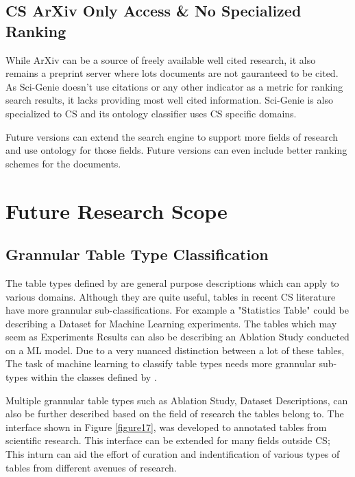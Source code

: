 \subsection{CS ArXiv Only Access \& No Specialized Ranking}
While ArXiv can be a source of freely available well cited research, it also remains a preprint server where lots documents are not gauranteed to be cited. As Sci-Genie doesn't use citations or any other indicator as a metric for ranking search results, it lacks providing most well cited information. Sci-Genie is also specialized to CS and its ontology classifier uses CS specific domains. 

Future versions can extend the search engine to support more fields of research and use ontology for those fields. Future versions can even include better ranking schemes for the documents.  

\section{Future Research Scope}
\label{conclusion:future-scope}
\subsection{Grannular Table Type Classification}
\label{conclusion:future-scope:type-class}

The table types defined by \cite{kim2012scientific} are general purpose descriptions which can apply to various domains. Although they are quite useful, tables in recent CS literature have more grannular sub-classifications. For example a "Statistics Table" could be describing a Dataset for Machine Learning experiments. The tables which may seem as Experiments Results can also be describing an Ablation Study conducted on a ML model. Due to a very nuanced distinction between a lot of these tables, The task of machine learning to classify table types needs more grannular sub-types within the classes defined by \cite{kim2012scientific}. 

Multiple grannular table types such as Ablation Study, Dataset Descriptions, can also be further described based on the field of research the tables belong to. The interface shown in Figure \ref{figure17}, was developed to annotated tables from scientific research. This interface can be extended for many fields outside CS; This inturn can aid the effort of curation and indentification of various types of tables from different avenues of research. 

